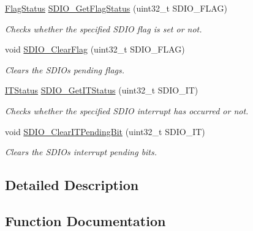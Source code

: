 \begin{DoxyCompactItemize}
\mbox{\hyperlink{group___exported__types_ga89136caac2e14c55151f527ac02daaff}{Flag\+Status}} \mbox{\hyperlink{group___s_d_i_o___exported___functions_ga644514b4b3c95c5c4326d99cd166f6f9}{S\+D\+I\+O\+\_\+\+Get\+Flag\+Status}} (uint32\+\_\+t S\+D\+I\+O\+\_\+\+F\+L\+AG)
\begin{DoxyCompactList}\small\item\em Checks whether the specified S\+D\+IO flag is set or not. \end{DoxyCompactList}\item 
void \mbox{\hyperlink{group___s_d_i_o___exported___functions_ga7aff4efdeb528229135f9f285e53518a}{S\+D\+I\+O\+\_\+\+Clear\+Flag}} (uint32\+\_\+t S\+D\+I\+O\+\_\+\+F\+L\+AG)
\begin{DoxyCompactList}\small\item\em Clears the S\+D\+IO\textquotesingle{}s pending flags. \end{DoxyCompactList}\item 
\mbox{\hyperlink{group___exported__types_gaacbd7ed539db0aacd973a0f6eca34074}{I\+T\+Status}} \mbox{\hyperlink{group___s_d_i_o___exported___functions_ga2d64af1f3df0f99cb518f9a89bbd02ac}{S\+D\+I\+O\+\_\+\+Get\+I\+T\+Status}} (uint32\+\_\+t S\+D\+I\+O\+\_\+\+IT)
\begin{DoxyCompactList}\small\item\em Checks whether the specified S\+D\+IO interrupt has occurred or not. \end{DoxyCompactList}\item 
void \mbox{\hyperlink{group___s_d_i_o___exported___functions_ga048e07fd86321cd01b2a22c071c3149b}{S\+D\+I\+O\+\_\+\+Clear\+I\+T\+Pending\+Bit}} (uint32\+\_\+t S\+D\+I\+O\+\_\+\+IT)
\begin{DoxyCompactList}\small\item\em Clears the S\+D\+IO\textquotesingle{}s interrupt pending bits. \end{DoxyCompactList}\end{DoxyCompactItemize}


\subsection{Detailed Description}


\subsection{Function Documentation}
\mbox{\label{group___s_d_i_o___exported___functions_gab44b8cbc21be000a291563076159503b}} 
